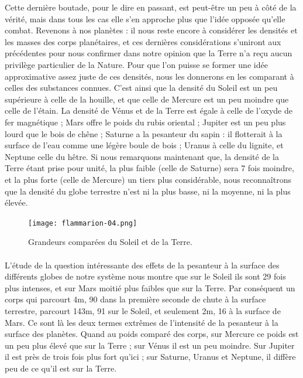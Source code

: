 \documentclass[a4paper, 11pt, oneside]{article}
\begin{document}
Cette dernière boutade, pour le dire en passant, est peut-être un peu à côté de la vérité, mais dans tous les cas elle s'en approche plus que l'idée opposée qu'elle combat. Revenons à nos planètes : il nous reste encore à considérer les densités et les masses des corps planétaires, et ces dernières considérations s'uniront aux précédentes pour nous confirmer dans notre opinion que la Terre n'a reçu aucun privilège particulier de la Nature. Pour que l'on puisse se former une idée approximative assez juste de ces densités, nous les donnerons en les comparant à celles des substances connues. C'est ainsi que la densité du Soleil est un peu supérieure à celle de la houille, et que celle de Mercure est un peu moindre que celle de l'étain. La densité de Vénus et de la Terre est égale à celle de l'oxyde de fer magnétique ; Mars offre le poids du rubis oriental ; Jupiter est un peu plus lourd que le bois de chêne ; Saturne a la pesanteur du sapin : il flotterait à la surface de l'eau comme une légère boule de bois ; Uranus à celle du lignite, et Neptune celle du hêtre. Si nous remarquons maintenant que, la densité de la Terre étant prise pour unité, la plus faible (celle de Saturne) sera 7 fois moindre, et la plus forte (celle de Mercure) un tiers plus considérable, nous reconnaîtrons que la densité du globe terrestre n'est ni la plus basse, ni la moyenne, ni la plus élevée.
\clearpage
\vspace*{\fill}
\begin{figure}[H]
\centering
\texttt{[image: flammarion-04.png]}
\caption{\Fontauri Grandeurs comparées du Soleil et de la Terre.}
\end{figure}
\vspace*{\fill}
\clearpage
\paragraph{}
L'étude de la question intéressante des effets de la pesanteur à la surface des différents globes de notre système nous montre que sur le Soleil ils sont 29 fois plus intenses, et sur Mars moitié plus faibles que sur la Terre. Par conséquent un corps qui parcourt 4m, 90 dans la première seconde de chute à la surface terrestre, parcourt 143m, 91 sur le Soleil, et seulement 2m, 16 à la surface de Mars. Ce sont là les deux termes extrêmes de l'intensité de la pesanteur à la surface des planètes. Quand au poids comparé des corps, sur Mercure ce poids est un peu plus élevé que sur la Terre ; sur Vénus il est un peu moindre. Sur Jupiter il est près de trois fois plus fort qu'ici ; sur Saturne, Uranus et Neptune, il diffère peu de ce qu'il est sur la Terre.
\end{document}
